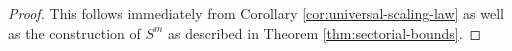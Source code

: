 \documentclass{amsart}
\begin{document}
\begin{proof}
    This follows immediately from Corollary \ref{cor:universal-scaling-law} as well as the construction of $S^m$ as described in Theorem \ref{thm:sectorial-bounds}.
%
\end{proof}
\end{document}
